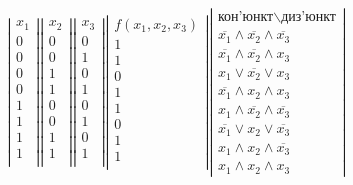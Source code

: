 \documentclass[14pt,a4paper]{scrartcl}
\theoremstyle{definition}
\theoremstyle{remark}
\theoremstyle{definition}
\theoremstyle{definition}
\begin{document}
  $$
  \left|
  \begin{gathered}
   x_1\\
   0\\
   0\\
   0\\
   0\\
   1\\
   1\\
   1\\
   1\\
  \end{gathered}
   \right|
   \left|
   \begin{gathered}
    x_2\\
    0\\
    0\\
    1\\
    1\\
    0\\
    0\\
    1\\
    1\\
   \end{gathered}
   \right|
   \left|
   \begin{gathered}
    x_3\\
    0\\
    1\\
    0\\
    1\\
    0\\
    1\\
    0\\
    1\\
   \end{gathered}
   \right|
   \left|
   \begin{gathered}
    f(x_1, x_2, x_3)\\
    1\\
    1\\
    0\\
    1\\
    1\\
    0\\
    1\\
    1\\
   \end{gathered}
   \right|
   \left|
   \begin{gathered}
    \text{кон'юнкт$\backslash$диз'юнкт}\\
  \overline{x_1} \land \overline{x_2} \land \overline{x_3}\\
  \overline{x_1} \land \overline{x_2} \land x_3\\
  x_1 \lor \overline{x_2} \lor x_3\\
  \overline{x_1} \land x_2 \land x_3\\
x_1 \land \overline{x_2} \land \overline{x_3}\\
\overline{x_1} \lor x_2 \lor \overline{x_3}\\
x_1 \land x_2 \land \overline{x_3}\\
x_1 \land x_2 \land x_3
   \end{gathered}
   \right|
  $$
\end{document}
